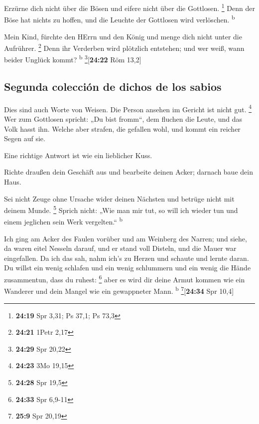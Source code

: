  Erzürne dich nicht über die Bösen und eifere nicht über
die Gottlosen. \footnote{\textbf{24:19} Spr 3,31; Ps 37,1; Ps 73,3}
 Denn der Böse hat nichts zu hoffen, und die Leuchte der
Gottlosen wird verlöschen. \textsuperscript{b}

 Mein Kind, fürchte den HErrn und den König und menge
dich nicht unter die Aufrührer. \footnote{\textbf{24:21} 1Petr 2,17}
 Denn ihr Verderben wird plötzlich entstehen; und wer
weiß, wann beider Unglück kommt? \textsuperscript{b}
\footnote{\textbf{24:29} Spr 20,22}{[}\textbf{24:22} Röm 13,2{]}

\hypertarget{segunda-colecciuxf3n-de-dichos-de-los-sabios}{%
\subsection{Segunda colección de dichos de los
sabios}\label{segunda-colecciuxf3n-de-dichos-de-los-sabios}}

 Dies sind auch Worte von Weisen. Die Person ansehen im
Gericht ist nicht gut. \footnote{\textbf{24:23} 3Mo 19,15}
 Wer zum Gottlosen spricht: „Du bist fromm``, dem fluchen
die Leute, und das Volk hasst ihn.  Welche aber strafen,
die gefallen wohl, und kommt ein reicher Segen auf sie.

 Eine richtige Antwort ist wie ein lieblicher Kuss.

 Richte draußen dein Geschäft aus und bearbeite deinen
Acker; darnach baue dein Haus.

 Sei nicht Zeuge ohne Ursache wider deinen Nächsten und
betrüge nicht mit deinem Munde. \footnote{\textbf{24:28} Spr 19,5}
 Sprich nicht: „Wie man mir tut, so will ich wieder tun
und einem jeglichen sein Werk vergelten.`` \textsuperscript{b}

 Ich ging am Acker des Faulen vorüber und am Weinberg des
Narren;  und siehe, da waren eitel Nesseln darauf, und er
stand voll Disteln, und die Mauer war eingefallen.  Da
ich das sah, nahm ich's zu Herzen und schaute und lernte daran.
 Du willst ein wenig schlafen und ein wenig schlummern
und ein wenig die Hände zusammentun, dass du ruhest: \footnote{\textbf{24:33}
  Spr 6,9-11}  aber es wird dir deine Armut kommen wie
ein Wanderer und dein Mangel wie ein gewappneter Mann.
\textsuperscript{b} \footnote{\textbf{25:9} Spr 20,19}{[}\textbf{24:34}
Spr 10,4{]}


